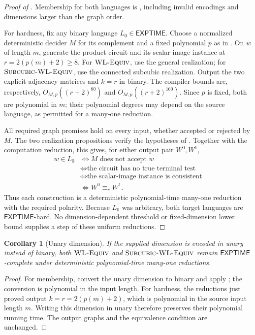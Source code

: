 \documentclass[11pt]{article}
\newtheorem{corollary}[theorem]{Corollary}
\theoremstyle{definition}
\begin{document}
\begin{proof}[Proof of ]
Membership for both languages is , including
invalid encodings and dimensions larger than the graph order.

For hardness, fix any binary language \(L_0\in\mathsf{EXPTIME}\).
Choose a normalized deterministic decider \(M\) for its complement
and a fixed polynomial \(p\) as in .
On \(w\) of length \(m\), generate the product circuit and its
scalar-image instance at \(r=2(p(m)+2)\ge8\). For \(\textnormal{\textsc{WL-Equiv}}\), use
the general realization; for \(\textnormal{\textsc{Subcubic-WL-Equiv}}\), use the connected subcubic
realization. Output the two explicit adjacency matrices and \(k=r\)
in binary. The compiler bounds are, respectively,
\(O_{M,p}((r+2)^{80})\) and \(O_{M,p}((r+2)^{160})\).
Since \(p\) is fixed, both are polynomial in \(m\); their polynomial
degrees may depend on the source language, as permitted for a
many-one reduction.

All required graph promises hold on every input, whether accepted
or rejected by \(M\). The two realization propositions verify the
hypotheses of . Together with the computation
reduction, this gives, for either output pair \(W^0,W^1\),
\[
\begin{aligned}
 w\in L_0
 &\Longleftrightarrow M\text{ does not accept }w\\
 &\Longleftrightarrow \text{the circuit has no true terminal test}\\
 &\Longleftrightarrow \text{the scalar-image instance is consistent}\\
 &\Longleftrightarrow W^0\equiv_r W^1.
\end{aligned}
\]
Thus each construction is a deterministic polynomial-time many-one
reduction with the required polarity. Because \(L_0\) was arbitrary,
both target languages are \(\mathsf{EXPTIME}\)-hard. No dimension-dependent
threshold or fixed-dimension lower bound supplies a step of these
uniform reductions.
\end{proof}


\begin{corollary}[Unary dimension]\label{cor:unary-dimension}
If the supplied dimension is encoded in unary instead of binary,
both \(\textnormal{\textsc{WL-Equiv}}\) and \(\textnormal{\textsc{Subcubic-WL-Equiv}}\) remain \(\mathsf{EXPTIME}\)-complete under
deterministic polynomial-time many-one reductions.
\end{corollary}

\begin{proof}
For membership, convert the unary dimension to binary and apply
; the conversion is polynomial in the input length.
For hardness, the reductions just proved output
\(k=r=2(p(m)+2)\), which is polynomial in the source input length \(m\).
Writing this dimension in unary therefore preserves their polynomial
running time. The output graphs and the equivalence condition are
unchanged.
\end{proof}



\end{document}
